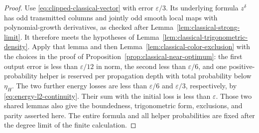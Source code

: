 \begin{proof}
Use \eqref{eq:clipped-classical-vector} with error
$\varepsilon/3$.  Its underlying formula $z^\delta$ has odd
transmitted columns and jointly odd smooth local maps with
polynomial-growth derivatives, as checked after
Lemma~\ref{lem:classical-strong-limit}.  It therefore meets the
hypotheses of Lemma~\ref{lem:classical-trigonometric-density}.
Apply that lemma and then Lemma~\ref{lem:classical-color-exclusion}
with the choices in the proof of
Proposition~\ref{prop:classical-near-optimum}: the first output error
is less than $\varepsilon/12$ in norm, the second less than
$\varepsilon/6$, and one positive-probability helper is reserved per
propagation depth with total probability below $\eta_H$.
The two further energy losses are less than $\varepsilon/6$ and
$\varepsilon/3$, respectively, by
\eqref{eq:energy-l2-continuity}.  Their sum with the initial loss is
less than $\varepsilon$.  Those two shared lemmas also give the
boundedness, trigonometric form, exclusions, and parity asserted here.
The entire formula and all helper probabilities are fixed after the
degree limit of the finite calculation.
\end{proof}
